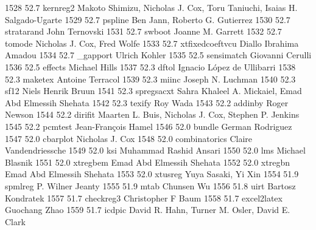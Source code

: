  1528     52.7    kernreg2      Makoto Shimizu, Nicholas J. Cox, Toru   
                                   Taniuchi, Isaias H. Salgado-Ugarte      
  1529     52.7    pspline       Ben Jann, Roberto G. Gutierrez          
  1530     52.7    stratarand    John Ternovski                          
  1531     52.7    swboot        Joanne M. Garrett                       
  1532     52.7    tomode        Nicholas J. Cox, Fred Wolfe             
  1533     52.7    xtfixedcoeftvcu  Diallo Ibrahima Amadou                  
  1534     52.7    _gapport      Ulrich Kohler                           
  1535     52.5    sensimatch    Giovanni Cerulli                        
  1536     52.5    effects       Michael Hills                           
  1537     52.3    dftol         Ignacio López de Ullibarri             
  1538     52.3    maketex       Antoine Terracol                        
  1539     52.3    miinc         Joseph N. Luchman                       
  1540     52.3    sf12          Niels Henrik Bruun                      
  1541     52.3    spregsacxt    Sahra Khaleel A. Mickaiel, Emad Abd     
                                   Elmessih Shehata                        
  1542     52.3    texify        Roy Wada                                
  1543     52.2    addinby       Roger Newson                            
  1544     52.2    dirifit       Maarten L. Buis, Nicholas J. Cox,       
                                   Stephen P. Jenkins                      
  1545     52.2    pcmtest       Jean-François Hamel                    
  1546     52.0    bundle        German Rodriguez                        
  1547     52.0    cbarplot      Nicholas J. Cox                         
  1548     52.0    combinatorics  Claire Vandendriessche                  
  1549     52.0    ksi           Muhammad Rashid Ansari                  
  1550     52.0    lms           Michael Blasnik                         
  1551     52.0    xtregbem      Emad Abd Elmessih Shehata               
  1552     52.0    xtregbn       Emad Abd Elmessih Shehata               
  1553     52.0    xtusreg       Yuya Sasaki, Yi Xin                     
  1554     51.9    spmlreg       P. Wilner Jeanty                        
  1555     51.9    mtab          Chunsen Wu                              
  1556     51.8    uirt          Bartosz Kondratek                       
  1557     51.7    checkreg3     Christopher F Baum                      
  1558     51.7    excel2latex   Guochang Zhao                           
  1559     51.7    icdpic        David R. Hahn, Turner M. Osler, David   
                                   E. Clark                                
